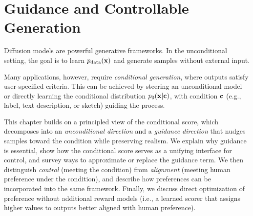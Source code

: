 \chapter{Guidance and Controllable Generation}\label{ch:guidance}
Diffusion models are powerful generative frameworks. In the unconditional setting, the goal is to learn $p_{\text{data}}({\mathbf{x}})$ and generate samples without external input.

Many applications, however, require \emph{conditional generation}, where outputs satisfy user-specified criteria. This can be achieved by steering an unconditional model or directly learning the conditional distribution $p_0({\mathbf{x}} | {\mathbf{c}})$, with condition ${\mathbf{c}}$ (e.g., label, text description, or sketch) guiding the process.

This chapter builds on a principled view of the conditional score, which decomposes into an \emph{unconditional direction} and a \emph{guidance direction} that nudges samples toward the condition while preserving realism. We explain why guidance is essential, show how the conditional score serves as a unifying interface for control, and survey ways to approximate or replace the guidance term. We then distinguish \emph{control} (meeting the condition) from \emph{alignment} (meeting human preference under the condition), and describe how preferences can be incorporated into the same framework. Finally, we discuss direct optimization of preference without additional reward models (i.e., a learned scorer that assigns higher values to outputs better aligned with human preference).







